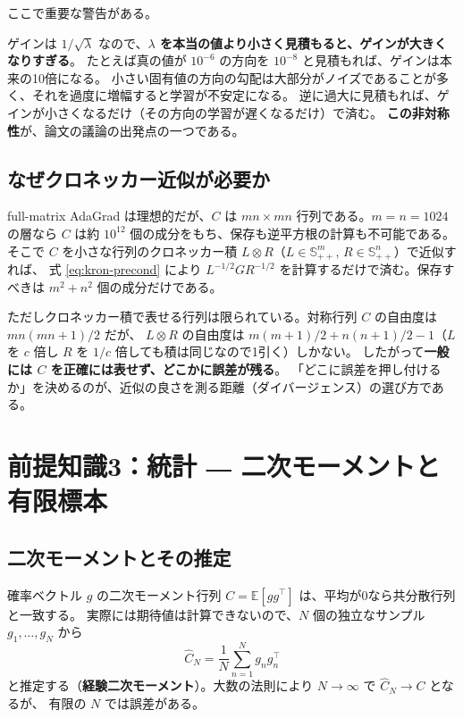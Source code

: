 \documentclass[a4paper,11pt]{ltjsarticle}
\theoremstyle{definition}
\theoremstyle{plain}
\newcommand{\E}{\mathbb{E}}
\newcommand{\Spd}[1]{\mathbb{S}^{#1}_{++}}
\newcommand{\T}{^{\top}}
\begin{document}
ここで重要な警告がある。

\begin{cautionbox}[逆平方根前処理の危うさ]
ゲインは $1/\sqrt{\lambda}$ なので、\textbf{$\lambda$ を本当の値より小さく見積もると、ゲインが大きくなりすぎる}。
たとえば真の値が $10^{-6}$ の方向を $10^{-8}$ と見積もれば、ゲインは本来の10倍になる。
小さい固有値の方向の勾配は大部分がノイズであることが多く、それを過度に増幅すると学習が不安定になる。
逆に過大に見積もれば、ゲインが小さくなるだけ（その方向の学習が遅くなるだけ）で済む。
\textbf{この非対称性}が、論文の議論の出発点の一つである。
\end{cautionbox}

\subsection{なぜクロネッカー近似が必要か}

full-matrix AdaGrad は理想的だが、$C$ は $mn\times mn$ 行列である。$m=n=1024$ の層なら
$C$ は約 $10^{12}$ 個の成分をもち、保存も逆平方根の計算も不可能である。
そこで $C$ を小さな行列のクロネッカー積 $L\otimes R$（$L\in\Spd{m}$, $R\in\Spd{n}$）で近似すれば、
式 \eqref{eq:kron-precond} により $L^{-1/2}GR^{-1/2}$ を計算するだけで済む。保存すべきは $m^2+n^2$ 個の成分だけである。

ただしクロネッカー積で表せる行列は限られている。対称行列 $C$ の自由度は $mn(mn+1)/2$ だが、
$L\otimes R$ の自由度は $m(m+1)/2 + n(n+1)/2 - 1$（$L$ を $c$ 倍し $R$ を $1/c$ 倍しても積は同じなので1引く）しかない。
したがって\textbf{一般には $C$ を正確には表せず、どこかに誤差が残る}。
「どこに誤差を押し付けるか」を決めるのが、近似の良さを測る距離（ダイバージェンス）の選び方である。

\section{前提知識3：統計 ― 二次モーメントと有限標本}\label{sec:prereq-stat}

\subsection{二次モーメントとその推定}

確率ベクトル $g$ の二次モーメント行列 $C = \E[gg\T]$ は、平均が0なら共分散行列と一致する。
実際には期待値は計算できないので、$N$ 個の独立なサンプル $g_1,\dots,g_N$ から
\begin{equation}
  \widehat C_N = \frac1N\sum_{n=1}^N g_n g_n\T
\end{equation}
と推定する（\textbf{経験二次モーメント}）。大数の法則により $N\to\infty$ で $\widehat C_N\to C$ となるが、
有限の $N$ では誤差がある。
\end{document}
